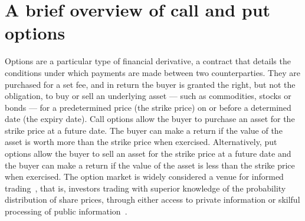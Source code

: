 \section{A brief overview of call and put options}

Options are a particular type of financial derivative, a contract that details the conditions under which payments are made between two counterparties. They are purchased for a set fee, and in return the buyer is granted the right, but not the obligation, to buy or sell an underlying asset --- such as commodities, stocks or bonds --- for a predetermined price (the strike price) on or before a determined date (the expiry date).
\nline{}
Call options allow the buyer to purchase an asset for the strike price at a future date. The buyer can make a return if the value of the asset is worth more than the strike price when exercised. Alternatively, put options allow the buyer to sell an asset for the strike price at a future date and the buyer can make a return if the value of the asset is less than the strike price when exercised.
\nline{}
The option market is widely considered a venue for informed trading~\cite{li2021effect,hu2014,chak2004}, that is, investors trading with superior knowledge of the probability distribution of share prices, through either access to private information or skilful processing of public information~\cite{grossman1975application}. 

